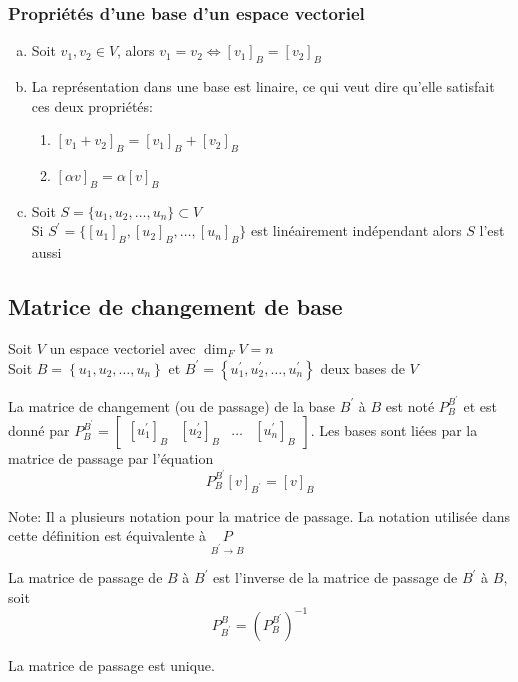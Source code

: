 \subsubsection{Propriétés d'une base d'un espace vectoriel}
\begin{enumerate}[a)]
      \item Soit $v_1, v_2 \in V$, alors $v_1 = v_2 \iff [v_1]_B = [v_2]_B$
      \item La représentation dans une base est linaire, ce qui veut dire qu'elle satisfait ces deux propriétés:
            \begin{enumerate}[1.]
                  \item $[v_1 + v_2]_B = [v_1]_B + [v_2]_B$
                  \item $[\alpha v]_B = \alpha [v]_B$
            \end{enumerate}
      \item Soit $S = \{ u_1, u_2, \ldots, u_n \} \subset V$ \\
            Si $S^\prime = \{ [u_1]_B, [u_2]_B, \ldots, [u_n]_B \}$ est linéairement indépendant alors $S$ l'est aussi
\end{enumerate}

\subsection{Matrice de changement de base}

Soit $V$ un espace vectoriel avec $\dim_F V = n$ \\
Soit $B = \left\{ u_1, u_2, \dots, u_n \right\}$ et $B^\prime = \left\{ u_1^\prime, u_2^\prime, \dots, u_n^\prime \right\}$ deux bases de $V$ 
\begin{definition}
      La matrice de changement (ou de passage) de la base $B^\prime$ à $B$ est noté
      $P^{B^\prime}_B$ et est donné par $P^{B^\prime}_B = \begin{bmatrix}
           [ u_1^\prime]_B & [u_2^\prime]_B & \dots & [u_n^\prime]_B
      \end{bmatrix}$. Les bases sont liées par la matrice de passage par l'équation 
      \[P^{B^\prime}_B [v]_{B^\prime} = [v]_B\]
\end{definition}
Note: Il a plusieurs notation pour la matrice de passage. La notation utilisée
dans cette définition est équivalente à $\underset{B^\prime \to B}{P}$
\begin{lemma}
      La matrice de passage de $B$ à $B^\prime$ est l'inverse de la matrice de passage de 
      $B^\prime$ à $B$, soit \[P^B_{B^\prime} = \left(P^{B^\prime}_B\right)^{-1}\]
\end{lemma}
\begin{lemma}
      La matrice de passage est unique.
\end{lemma}

